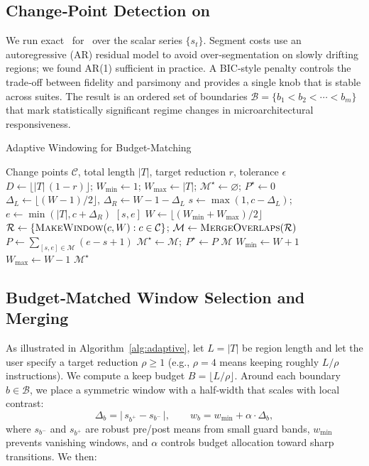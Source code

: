 \subsection{Change‑Point Detection on \pts}
We run exact \pelt\ for \cpd\ over the scalar series \(\{s_t\}\). Segment costs use an autoregressive (AR) residual model to avoid over‑segmentation on slowly drifting regions; we found AR(1) sufficient in practice. A BIC‑style penalty controls the trade‑off between fidelity and parsimony and provides a single knob that is stable across suites. The result is an ordered set of boundaries \(\mathcal{B}=\{b_1<b_2<\cdots<b_m\}\) that mark statistically significant regime changes in microarchitectural responsiveness.
\begin{algorithm}[t]
\caption{Adaptive Windowing for Budget-Matching}
\label{alg:adaptive}
\small
\begin{algorithmic}[1]
\Require Change points \(\mathcal{C}\), total length \(|T|\), target reduction \(r\), tolerance \(\epsilon\)
\State \(D\gets \lfloor |T|\,(1-r)\rfloor\); \(W_{\min}\gets 1\); \(W_{\max}\gets |T|\); \(\mathcal{M}^\star\gets\varnothing\); \(P^\star\gets 0\)
  \State \(\Delta_L\gets\lfloor(W-1)/2\rfloor\), \(\Delta_R\gets W-1-\Delta_L\)
  \State \(s\gets\max(1,c-\Delta_L)\); \(e\gets\min(|T|,c+\Delta_R)\)
  \State \Return \([s,e]\)
\EndFunction
{}
  \State \(W\gets\lfloor(W_{\min}+W_{\max})/2\rfloor\)
  \State \(\mathcal{R}\gets \{\textsc{MakeWindow}(c,W):c\in\mathcal{C}\}\); \(\mathcal{M}\gets \textsc{MergeOverlaps}(\mathcal{R})\)
  \State \(P\gets\sum_{[s,e]\in\mathcal{M}}(e-s+1)\)
   \(\mathcal{M}^\star\gets\mathcal{M};\ P^\star\gets P\) \EndIf
   \Return \(\mathcal{M}\) \EndIf
   \State \(W_{\min}\gets W+1\) \Else \State \(W_{\max}\gets W-1\) \EndIf
\EndWhile
\State \Return \(\mathcal{M}^\star\) 
\end{algorithmic}
\end{algorithm}
\subsection{Budget‑Matched Window Selection and Merging}
As illustrated in Algorithm~\ref{alg:adaptive}, let \(L=|T|\) be region length and let the user specify a target reduction \(\rho\!\ge\!1\) (e.g., \(\rho\!=\!4\) means keeping roughly \(L/\rho\) instructions). We compute a keep budget \(B=\lfloor L/\rho \rfloor\). Around each boundary \(b\in\mathcal{B}\), we place a symmetric window with a half‑width that scales with local contrast:
\[
\Delta_b=\big|\,s_{b^+}-s_{b^-}\,\big|,\qquad
w_b = w_{\min} + \alpha\cdot \Delta_b,
\]
where \(s_{b^-}\) and \(s_{b^+}\) are robust pre/post means from small guard bands, \(w_{\min}\) prevents vanishing windows, and \(\alpha\) controls budget allocation toward sharp transitions. We then:

